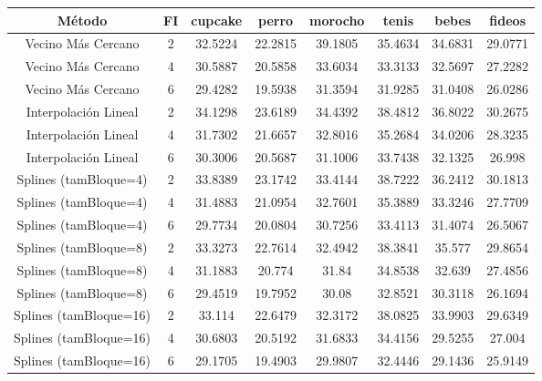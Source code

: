 \bigskip
{}
\begin{tabular}{| c | c | c | c | c | c | c | c |} 
\hline
\textbf{Método} & \textbf{FI} & \textbf{cupcake} & \textbf{perro} & \textbf{morocho} & \textbf{tenis} & \textbf{bebes} & \textbf{fideos} \\ 
\hline
Vecino Más Cercano & 2 & 32.5224 &  22.2815 & 39.1805 &  35.4634 & 34.6831 & 29.0771 \\
\hline
Vecino Más Cercano & 4 & 30.5887 &  20.5858 & 33.6034 &  33.3133 & 32.5697 & 27.2282 \\
\hline
Vecino Más Cercano & 6 & 29.4282 &  19.5938 & 31.3594 &  31.9285 & 31.0408 &  26.0286 \\
\hline
Interpolación Lineal & 2 & 34.1298 &  23.6189 & 34.4392 &  38.4812 & 36.8022 &   30.2675 \\
\hline
Interpolación Lineal & 4 & 31.7302 &  21.6657 & 32.8016 &  35.2684 & 34.0206 &  28.3235 \\
\hline
Interpolación Lineal & 6 & 30.3006 & 20.5687  & 31.1006 &  33.7438 & 32.1325 & 26.998 \\
\hline
Splines (tamBloque=4) & 2 & 33.8389 &  23.1742 & 33.4144 &  38.7222 & 36.2412 & 30.1813 \\
\hline
Splines (tamBloque=4) & 4 & 31.4883 &  21.0954 & 32.7601 &  35.3889 & 33.3246 &  27.7709 \\
\hline
Splines (tamBloque=4) & 6 & 29.7734 &  20.0804 & 30.7256 & 33.4113  & 31.4074 & 26.5067 \\
\hline
Splines (tamBloque=8) & 2 & 33.3273 & 22.7614  & 32.4942 &  38.3841 & 35.577 &  29.8654 \\
\hline
Splines (tamBloque=8) & 4 & 31.1883 &  20.774 & 31.84 &  34.8538 & 32.639 &  27.4856 \\
\hline
Splines (tamBloque=8) & 6 & 29.4519 &  19.7952 & 30.08 &  32.8521 & 30.3118 & 26.1694 \\
\hline
Splines (tamBloque=16) & 2 & 33.114 &  22.6479 & 32.3172 &  38.0825 & 33.9903 & 29.6349  \\
\hline
Splines (tamBloque=16) & 4 & 30.6803 &  20.5192 & 31.6833 &  34.4156 & 29.5255  & 27.004 \\
\hline
Splines (tamBloque=16) & 6 & 29.1705 &  19.4903 & 29.9807 &  32.4446 & 29.1436 & 25.9149 \\
\hline
\end{tabular}

\bigskip